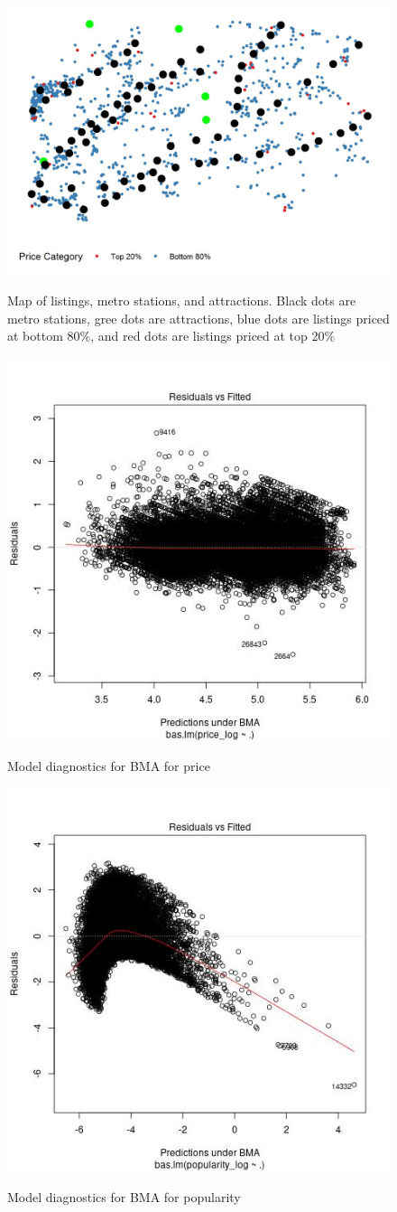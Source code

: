 \documentclass[10pt]{jmlr}%
\begin{document}
\begin{figure}[htbp]
	\centering
	\caption{Map of listings, metro stations, and attractions. Black dots are metro stations, gree dots are attractions, blue dots are listings priced at bottom 80\%, and red dots are listings priced at top 20\%}
	\includegraphics[width=0.5\linewidth]{map_eda.jpeg}
	\label{fig:map_eda}
\end{figure}

\begin{figure}[htbp]
	\centering
	\caption{Model diagnostics for BMA for price}
	\includegraphics[width=0.5\linewidth]{price_diagnostic_plot.jpeg}
	\label{fig:price_diag}
\end{figure}

\begin{figure}[htbp]
	\centering
	\caption{Model diagnostics for BMA for popularity}
	\includegraphics[width=0.5\linewidth]{pop_diagnostic_plot.jpeg}
	\label{fig:pop_diag}
\end{figure}
\end{document}
